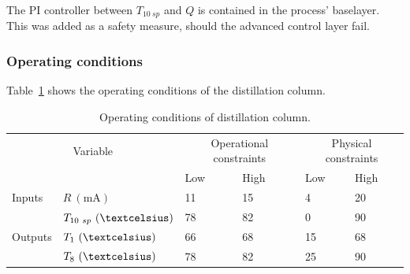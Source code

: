 The PI controller between $T_{10~sp}$ and $Q$ is contained in the process' baselayer. 
This was added as a safety measure, should the advanced control layer fail.

\subsubsection{Operating conditions}
Table~\ref{tab:columnopcon} shows the operating conditions of the distillation column.
\begin{table}[htbp]
  \centering
  \begin{tabular}{llllll}
    \toprule
    \multicolumn{2}{c}{Variable} & \multicolumn{2}{c}{Operational constraints} & \multicolumn{2}{c}{Physical constraints} \\
    && Low & High & Low & High \\ 
    \midrule
    Inputs &$R~(\text{mA})$          & 11 & 15 & 4 & 20 \\
           &$T_{10~sp}~(\textcelsius)$ & 78 & 82 & 0 & 90 \\[1.3ex]
    Outputs &$T_1~(\textcelsius)$     & 66 & 68 & 15 & 68 \\
            &$T_{8}~(\textcelsius)$   & 78 & 82 & 25 & 90 \\
    \bottomrule
  \end{tabular}
  \caption{Operating conditions of distillation column.}
  \label{tab:columnopcon}
\end{table}


